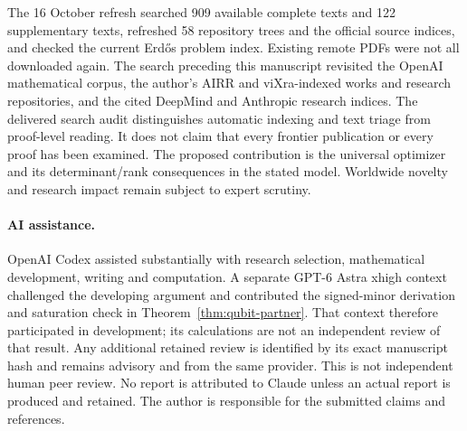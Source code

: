 \documentclass[11pt,a4paper]{article}
\theoremstyle{remark}\newtheorem{remark}[theorem]{Remark}
\begin{document}
The 16 October refresh searched 909 available complete texts and 122 supplementary texts, refreshed 58 repository trees and the official source indices, and checked the current Erd\H{o}s problem index. Existing remote PDFs were not all downloaded again. The search preceding this manuscript revisited the OpenAI mathematical corpus, the author's AIRR and viXra-indexed works and research repositories, and the cited DeepMind and Anthropic research indices. The delivered search audit distinguishes automatic indexing and text triage from proof-level reading. It does not claim that every frontier publication or every proof has been examined. The proposed contribution is the universal optimizer and its determinant/rank consequences in the stated model. Worldwide novelty and research impact remain subject to expert scrutiny.

\paragraph{AI assistance.}
OpenAI Codex assisted substantially with research selection, mathematical development, writing and computation. A separate GPT-6 Astra xhigh context challenged the developing argument and contributed the signed-minor derivation and saturation check in Theorem~\ref{thm:qubit-partner}. That context therefore participated in development; its calculations are not an independent review of that result. Any additional retained review is identified by its exact manuscript hash and remains advisory and from the same provider. This is not independent human peer review. No report is attributed to Claude unless an actual report is produced and retained. The author is responsible for the submitted claims and references.
\end{document}
